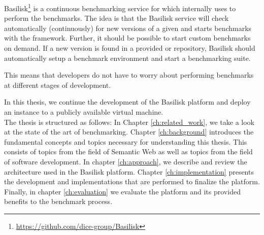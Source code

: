 Basilisk\footnote{\url{https://github.com/dice-group/Basilisk}} is a continuous benchmarking service for \tsp{} which internally uses \iguana{} to perform the benchmarks.
The idea is that the Basilisk service will check automatically (continuously) for new versions of a given \tsp{} and starts benchmarks with the \iguana{} framework.
Further, it should be possible to start custom benchmarks on demand.
If a new version is found in a provided \gh{} or \dockh{} repository, Basilisk should automatically setup a benchmark environment and start a benchmarking suite.

This means that developers do not have to worry about performing benchmarks at different stages of development.

In this thesis, we continue the development of the Basilisk platform and deploy an instance to a publicly available virtual machine.
\\

The thesis is structured as follows:
In Chapter \ref{ch:related_work}, we take a look at the state of the art of \ts{} benchmarking. 
Chapter \ref{ch:background} introduces the fundamental concepts and topics necessary for understanding this thesis.
This consists of topics from the field of Semantic Web as well as topics from the field of software development.
In chapter \ref{ch:approach}, we describe and review the architecture used in the Basilisk platform.
Chapter \ref{ch:implementation} presents the development and implementations that are performed to finalize the platform.
Finally, in chapter \ref{ch:evaluation} we evaluate the platform and its provided benefits to the \ts{} benchmark process.

